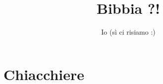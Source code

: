 \documentclass[a4paper,twocolumn]{article}
\theoremstyle{definition}
\theoremstyle{remark}
\theoremstyle{plain}
\begin{document}
\author{Io (sì ci risiamo :)}
\title{\textbf{Bibbia ?!}}
\maketitle






\section*{Chiacchiere}
\end{document}
